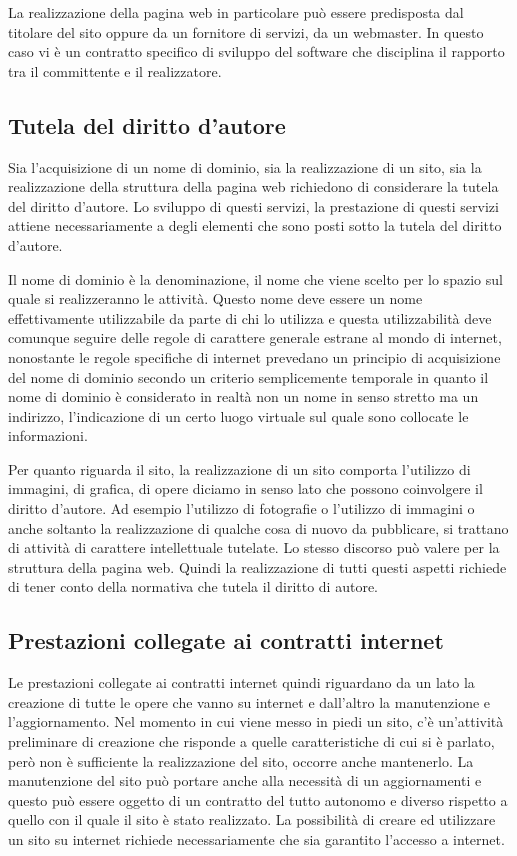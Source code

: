 La realizzazione della pagina web in particolare può essere predisposta dal titolare del sito oppure da un fornitore di servizi, da un webmaster. In questo caso vi è un contratto specifico di sviluppo del software che disciplina il rapporto tra il committente e il realizzatore. 

\subsection{Tutela del diritto d'autore}
Sia l'acquisizione di un nome di dominio, sia la realizzazione di un sito, sia la realizzazione della struttura della pagina web richiedono di considerare la tutela del diritto d'autore. Lo sviluppo di questi servizi, la prestazione di questi servizi attiene necessariamente a degli elementi che sono posti sotto la tutela del diritto d'autore. 

Il nome di dominio è la denominazione, il nome che viene scelto per lo spazio sul quale si realizzeranno le attività. Questo nome deve essere un nome effettivamente utilizzabile da parte di chi lo utilizza e questa utilizzabilità deve comunque seguire delle regole di carattere generale estrane al mondo di internet, nonostante le regole specifiche di internet prevedano un principio di acquisizione del nome di dominio secondo un criterio semplicemente temporale in quanto il nome di dominio è considerato in realtà non un nome in senso stretto ma un indirizzo, l'indicazione di un certo luogo virtuale sul quale sono collocate le informazioni. 

Per quanto riguarda il sito, la realizzazione di un sito comporta l'utilizzo di immagini, di grafica, di opere diciamo in senso lato che possono coinvolgere il diritto d'autore. Ad esempio l'utilizzo di fotografie o l'utilizzo di immagini o anche soltanto la realizzazione di qualche cosa di nuovo da pubblicare, si trattano di attività di carattere intellettuale tutelate. Lo stesso discorso può valere per la struttura della pagina web. Quindi la realizzazione di tutti questi aspetti richiede di tener conto della normativa che tutela il diritto di autore. 


\subsection{Prestazioni collegate ai contratti internet}
Le prestazioni collegate ai contratti internet quindi riguardano da un lato la creazione di tutte le opere che vanno su internet e dall'altro la manutenzione e l'aggiornamento. 
Nel momento in cui viene messo in piedi un sito, c'è un'attività preliminare di creazione che risponde a quelle caratteristiche di cui si è parlato, però non è sufficiente la realizzazione del sito, occorre anche mantenerlo. La manutenzione del sito può portare anche alla necessità di un aggiornamenti  e questo può essere oggetto di un contratto del tutto autonomo e diverso rispetto a quello con il quale il sito è stato realizzato. 
La possibilità di creare ed utilizzare un sito su internet richiede necessariamente che sia garantito l'accesso a internet. 

